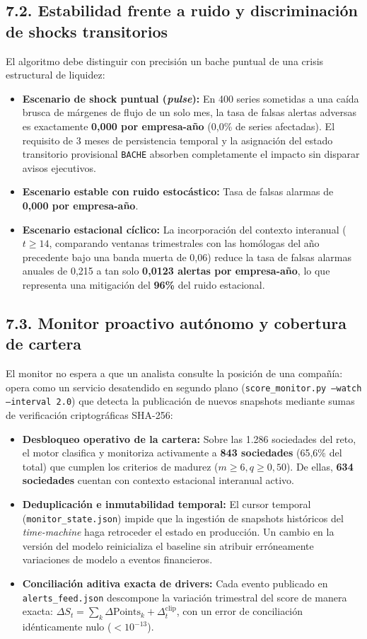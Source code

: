 \documentclass[10pt,a4paper]{article}
\begin{document}
\subsection*{7.2. Estabilidad frente a ruido y discriminación de shocks transitorios}
El algoritmo debe distinguir con precisión un bache puntual de una crisis estructural de liquidez:
\begin{itemize}[leftmargin=*, noitemsep]
  \item \textbf{Escenario de shock puntual (\emph{pulse}):} En 400 series sometidas a una caída brusca de márgenes de flujo de un solo mes, la tasa de falsas alertas adversas es exactamente \textbf{0,000 por empresa-año} (0,0\% de series afectadas). El requisito de 3 meses de persistencia temporal y la asignación del estado transitorio provisional \texttt{BACHE} absorben completamente el impacto sin disparar avisos ejecutivos.
  \item \textbf{Escenario estable con ruido estocástico:} Tasa de falsas alarmas de \textbf{0,000 por empresa-año}.
  \item \textbf{Escenario estacional cíclico:} La incorporación del contexto interanual ($t \ge 14$, comparando ventanas trimestrales con las homólogas del año precedente bajo una banda muerta de 0,06) reduce la tasa de falsas alarmas anuales de 0,215 a tan solo \textbf{0,0123 alertas por empresa-año}, lo que representa una mitigación del \textbf{96\%} del ruido estacional.
\end{itemize}

\subsection*{7.3. Monitor proactivo autónomo y cobertura de cartera}
El monitor no espera a que un analista consulte la posición de una compañía: opera como un servicio desatendido en segundo plano (\texttt{score\_monitor.py --watch --interval 2.0}) que detecta la publicación de nuevos snapshots mediante sumas de verificación criptográficas SHA-256:
\begin{itemize}[leftmargin=*, noitemsep]
  \item \textbf{Desbloqueo operativo de la cartera:} Sobre las 1.286 sociedades del reto, el motor clasifica y monitoriza activamente a \textbf{843 sociedades} (65,6\% del total) que cumplen los criterios de madurez ($m \ge 6, q \ge 0{,}50$). De ellas, \textbf{634 sociedades} cuentan con contexto estacional interanual activo.
  \item \textbf{Deduplicación e inmutabilidad temporal:} El cursor temporal (\texttt{monitor\_state.json}) impide que la ingestión de snapshots históricos del \emph{time-machine} haga retroceder el estado en producción. Un cambio en la versión del modelo reinicializa el baseline sin atribuir erróneamente variaciones de modelo a eventos financieros.
  \item \textbf{Conciliación aditiva exacta de drivers:} Cada evento publicado en \texttt{alerts\_feed.json} descompone la variación trimestral del score de manera exacta: $\Delta S_t = \sum_k \Delta \text{Points}_k + \Delta_t^{\mathrm{clip}}$, con un error de conciliación idénticamente nulo ($< 10^{-13}$).
\end{itemize}
\end{document}
